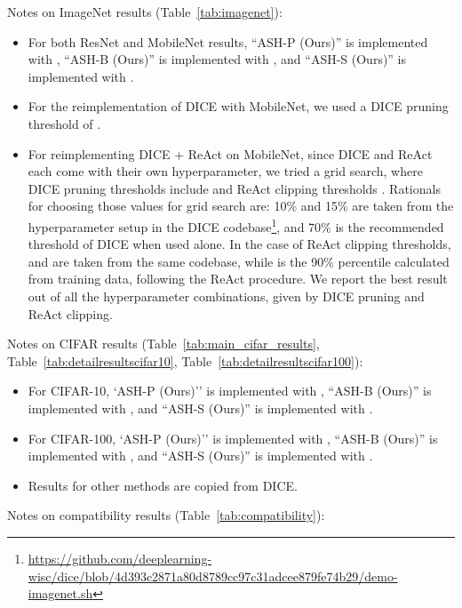 \documentclass{article}
\newcommand{\tabref}[1]{Table~\ref{tab:#1}}
\begin{document}
Notes on ImageNet results (\tabref{imagenet}): 
\begin{itemize}
    \item For both ResNet and MobileNet results, ``ASH-P (Ours)'' is implemented with , ``ASH-B (Ours)'' is implemented with , and ``ASH-S (Ours)'' is implemented with .  
    
    \item For the reimplementation of DICE with MobileNet, we used a DICE pruning threshold of . 
    \item For reimplementing DICE + ReAct on MobileNet, since DICE and ReAct each come with their own hyperparameter, we tried a grid search, where DICE pruning thresholds include  and ReAct clipping thresholds . Rationals for choosing those values for grid search are: 10\% and 15\% are taken from the hyperparameter setup in the DICE codebase\footnote{\url{https://github.com/deeplearning-wisc/dice/blob/4d393c2871a80d8789cc97c31adcee879fe74b29/demo-imagenet.sh}}, and 70\% is the recommended threshold of DICE when used alone. In the case of ReAct clipping thresholds,  and  are taken from the same codebase, while  is the 90\% percentile calculated from training data, following the ReAct procedure. We report the best result out of all the hyperparameter combinations, given by  DICE pruning and  ReAct clipping.
\end{itemize}

Notes on CIFAR results (\tabref{main_cifar_results}, \tabref{detailresultscifar10}, \tabref{detailresultscifar100}):
\begin{itemize}
    \item For CIFAR-10, `ASH-P (Ours)'' is implemented with , ``ASH-B (Ours)'' is implemented with , and ``ASH-S (Ours)'' is implemented with . \item For CIFAR-100, `ASH-P (Ours)'' is implemented with , ``ASH-B (Ours)'' is implemented with , and ``ASH-S (Ours)'' is implemented with .
    \item Results for other methods are copied from DICE.
\end{itemize}

Notes on compatibility results (\tabref{compatibility}):
\end{document}
